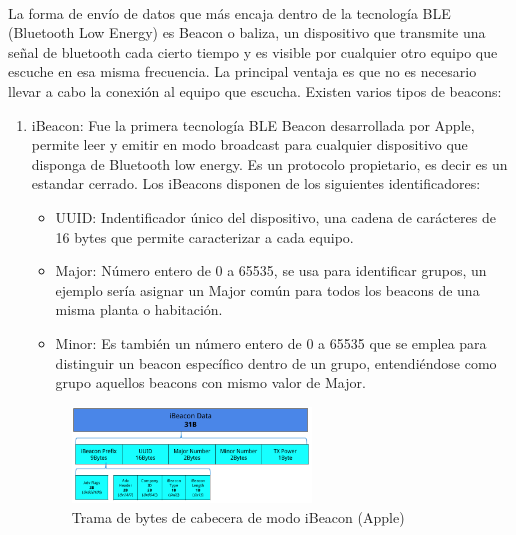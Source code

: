\documentclass[a4paper ,12pt, onecolumn]{article}
\begin{document}
            \paragraph{}
            La forma de envío de datos que más encaja dentro de la tecnología BLE (Bluetooth Low Energy) es Beacon o baliza, un 
            dispositivo que transmite una señal de bluetooth cada cierto tiempo y es visible por cualquier otro equipo que escuche 
            en esa misma frecuencia. La principal ventaja es que no es necesario llevar a cabo la conexión al equipo que escucha.
            Existen varios tipos de beacons:
            \begin{enumerate}
                \item iBeacon: Fue la primera tecnología BLE Beacon desarrollada por Apple, permite leer y emitir en modo 
                broadcast para cualquier dispositivo que disponga de Bluetooth low energy. Es un protocolo propietario, es 
                decir es un estandar cerrado. 
                Los iBeacons disponen de los siguientes identificadores:
                \begin{itemize}
                    \item UUID: Indentificador único del dispositivo, una cadena de carácteres de 16 bytes
                    que permite caracterizar a cada equipo.
                    \item Major: Número entero de 0 a 65535, se usa para identificar grupos, un ejemplo sería 
                    asignar un Major común para todos los beacons de una misma planta o habitación.
                    \item Minor: Es también un número entero de 0 a 65535 que se emplea para distinguir un beacon
                    específico dentro de un grupo, entendiéndose como grupo aquellos beacons con mismo valor de Major.
                \end{itemize}
                \begin{center}
                    \begin{figure}[ht]
                        \centering
                        \includegraphics[width=0.6\textwidth]{tipos_beacon_ibeacon.PNG}
                        \caption{Trama de bytes de cabecera de modo iBeacon (Apple)}

\end{figure}
\end{center}
\end{enumerate}
\end{document}
